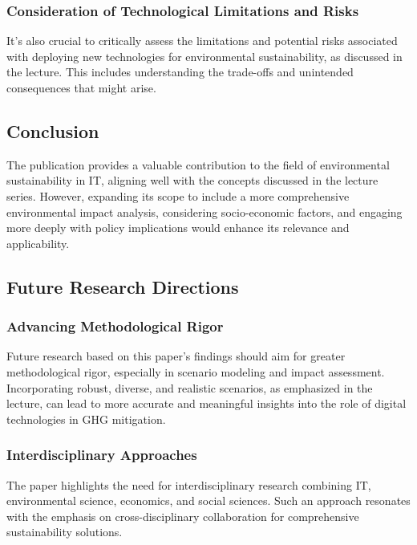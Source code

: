 \documentclass[conference,compsoc]{IEEEtran}
\begin{document}
\subsubsection{Consideration of Technological Limitations and Risks}

It's also crucial to critically assess the limitations and potential risks associated with deploying new technologies for environmental sustainability, as discussed in the lecture. This includes understanding the trade-offs and unintended consequences that might arise.

\subsection{Conclusion}

The publication provides a valuable contribution to the field of environmental sustainability in IT, aligning well with the concepts discussed in the lecture series. However, expanding its scope to include a more comprehensive environmental impact analysis, considering socio-economic factors, and engaging more deeply with policy implications would enhance its relevance and applicability.

\subsection{Future Research Directions}

\subsubsection{Advancing Methodological Rigor}

Future research based on this paper's findings should aim for greater methodological rigor, especially in scenario modeling and impact assessment. Incorporating robust, diverse, and realistic scenarios, as emphasized in the lecture, can lead to more accurate and meaningful insights into the role of digital technologies in GHG mitigation.

\subsubsection{Interdisciplinary Approaches}

The paper highlights the need for interdisciplinary research combining IT, environmental science, economics, and social sciences. Such an approach resonates with the  emphasis on cross-disciplinary collaboration for comprehensive sustainability solutions.
\end{document}
